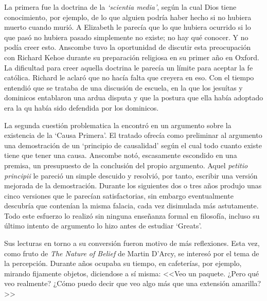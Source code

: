 La primera fue la doctrina de la \emph{`scientia media'}, según la cual Dios tiene conocimiento, por ejemplo, de lo que alguien podría haber hecho si no hubiera muerto cuando murió. A Elizabeth le parecía que lo que hubiera ocurrido si lo que pasó no hubiera pasado simplemente no existe; no hay qué conocer. Y no podía creer esto. Anscombe tuvo la oportunidad de discutir esta preocupación con Richard Kehoe durante su preparación religiosa en su primer año en Oxford. La dificultad para creer aquella doctrina le parecía un límite para aceptar la fe católica. Richard le aclaró que no hacía falta que creyera en eso. Con el tiempo entendió que se trataba de una discusión de escuela, en la que los jesuítas y dominicos entablaron una ardua disputa y que la postura que ella había adoptado era la qu había sido defendida por los dominicos.\autocite[cf.~][p.~vii]{anscombe1981metaphysicsintro}

La segunda cuestión problematica la encontró en un argumento sobre la existencia de la `Causa Primera'. El tratado ofrecía como preliminar al argumento una demostración de un `principio de causalidad' según el cual todo cuanto existe tiene que tener una causa. Anscombe notó, escasamente escondido en una premisa, un presupuesto de la conclusión del propio argumento. Aquel \emph{petitio principii} le pareció un simple descuido y resolvió, por tanto, escribir una versión mejorada de la demostración. Durante los siguientes dos o tres años produjo unas cinco versiones que le parecían satisfactorias, sin embargo eventualmente descubría que contenían la misma falacia, cada vez disimulada más astutamente. Todo este esfuerzo lo realizó sin ninguna enseñanza formal en filosofía, incluso su último intento de argumento lo hizo antes de estudiar `Greats'.\autocite[cf.~][p.~vii]{anscombe1981metaphysicsintro}


Sus lecturas en torno a su conversión fueron motivo de más reflexiones. Esta vez, como fruto de \emph{The Nature of Belief} de Martin D'Arcy, se interesó por el tema de la percepción. Durante años ocupaba su tiempo, en cafeterías, por ejemplo, mirando fijamente objetos, diciendose a sí misma: <<Veo un paquete. ¿Pero qué veo realmente? ¿Cómo puedo decir que veo algo más que una extensión amarilla?>>\autocite[cf.~][p.~viii]{anscombe1981metaphysicsintro}

